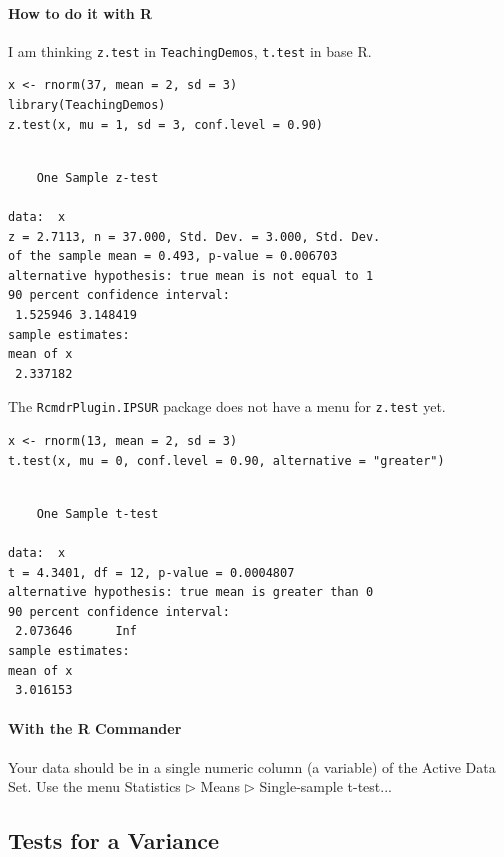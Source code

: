 \documentclass[captions=tableheading]{scrbook}
\begin{document}
\paragraph*{How to do it with \textsf{R}}

I am thinking \texttt{z.test} in \texttt{TeachingDemos}, \texttt{t.test} in base \textsf{\small R}.


\begin{verbatim}
x <- rnorm(37, mean = 2, sd = 3)
library(TeachingDemos)
z.test(x, mu = 1, sd = 3, conf.level = 0.90)
\end{verbatim}


\begin{verbatim}
 
	One Sample z-test

data:  x 
z = 2.7113, n = 37.000, Std. Dev. = 3.000, Std. Dev.
of the sample mean = 0.493, p-value = 0.006703
alternative hypothesis: true mean is not equal to 1 
90 percent confidence interval:
 1.525946 3.148419 
sample estimates:
mean of x 
 2.337182
\end{verbatim}

The \texttt{RcmdrPlugin.IPSUR} package does not have a menu for \texttt{z.test} yet. 


\begin{verbatim}
x <- rnorm(13, mean = 2, sd = 3)
t.test(x, mu = 0, conf.level = 0.90, alternative = "greater")
\end{verbatim}


\begin{verbatim}

	One Sample t-test

data:  x 
t = 4.3401, df = 12, p-value = 0.0004807
alternative hypothesis: true mean is greater than 0 
90 percent confidence interval:
 2.073646      Inf 
sample estimates:
mean of x 
 3.016153
\end{verbatim}

\paragraph*{With the \textsf{R} Commander}

Your data should be in a single numeric column (a variable) of the Active Data Set. Use the menu \textsf{Statistics \(\triangleright\) Means \(\triangleright\) Single-sample t-test...} 
\subsection{Tests for a Variance}
\label{sec-10-2-2}
\end{document}
